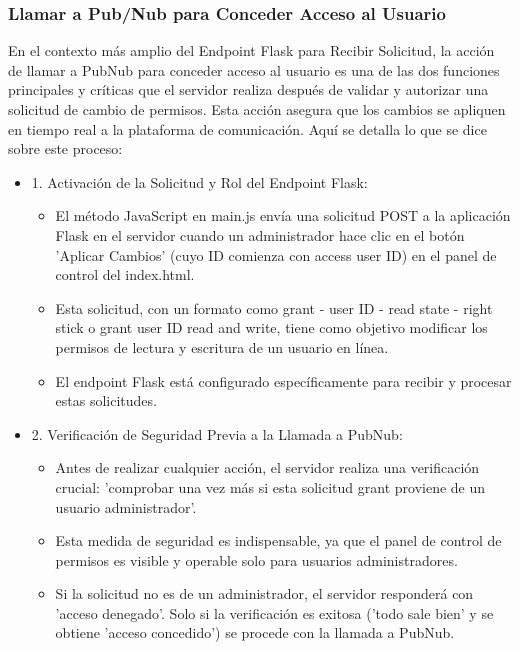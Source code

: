 \documentclass{report}
\begin{document}
\subsubsection{Llamar a Pub/Nub para Conceder Acceso al Usuario}
En el contexto más amplio del Endpoint Flask para Recibir Solicitud, la acción de llamar a PubNub para conceder acceso al usuario es una de 
las dos funciones principales y críticas que el servidor realiza después de validar y autorizar una solicitud de cambio de permisos. 
Esta acción asegura que los cambios se apliquen en tiempo real a la plataforma de comunicación.
Aquí se detalla lo que se dice sobre este proceso:
\begin{itemize}
    \item 1. Activación de la Solicitud y Rol del Endpoint Flask:
        \begin{itemize}
            \item El método JavaScript en main.js envía una solicitud POST a la aplicación Flask en el servidor cuando un administrador 
            hace clic en el botón 'Aplicar Cambios' (cuyo ID comienza con access user ID) en el panel de control del index.html.
            \item Esta solicitud, con un formato como grant - user ID - read state - right stick o grant user ID read and write, tiene como 
            objetivo modificar los permisos de lectura y escritura de un usuario en línea.
            \item El endpoint Flask está configurado específicamente para recibir y procesar estas solicitudes.
        \end{itemize}
    \item 2. Verificación de Seguridad Previa a la Llamada a PubNub:
        \begin{itemize}
            \item Antes de realizar cualquier acción, el servidor realiza una verificación crucial: 'comprobar una vez más si esta solicitud 
            grant proviene de un usuario administrador'.
            \item Esta medida de seguridad es indispensable, ya que el panel de control de permisos es visible y operable solo para usuarios 
            administradores.
            \item Si la solicitud no es de un administrador, el servidor responderá con 'acceso denegado'. Solo si la verificación es exitosa 
            ('todo sale bien' y se obtiene 'acceso concedido') se procede con la llamada a PubNub.

\end{itemize}
\end{itemize}
\end{document}
